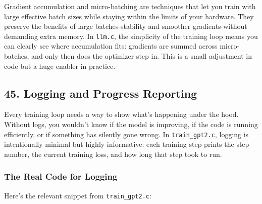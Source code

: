 \documentclass[
  letterpaper,
  DIV=11,
  numbers=noendperiod]{scrreprt}
\begin{document}
Gradient accumulation and micro-batching are techniques that let you
train with large effective batch sizes while staying within the limits
of your hardware. They preserve the benefits of large batches-stability
and smoother gradients-without demanding extra memory. In
\texttt{llm.c}, the simplicity of the training loop means you can
clearly see where accumulation fits: gradients are summed across
micro-batches, and only then does the optimizer step in. This is a small
adjustment in code but a huge enabler in practice.

\subsection{45. Logging and Progress
Reporting}\label{logging-and-progress-reporting}

Every training loop needs a way to show what's happening under the hood.
Without logs, you wouldn't know if the model is improving, if the code
is running efficiently, or if something has silently gone wrong. In
\texttt{train\_gpt2.c}, logging is intentionally minimal but highly
informative: each training step prints the step number, the current
training loss, and how long that step took to run.

\subsubsection{The Real Code for
Logging}\label{the-real-code-for-logging}

Here's the relevant snippet from \texttt{train\_gpt2.c}:
\end{document}

